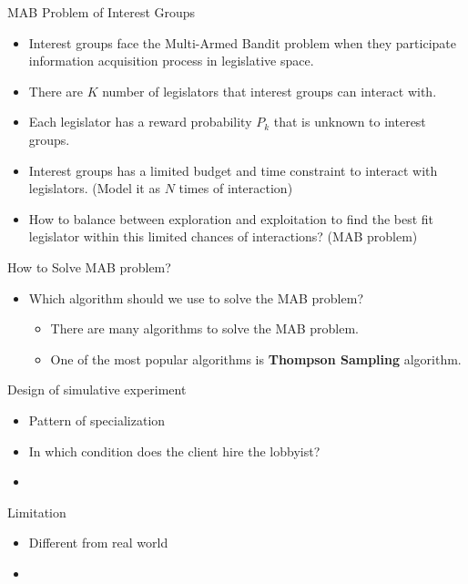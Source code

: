 \documentclass{beamer}
\begin{document}
	\begin{frame}{MAB Problem of Interest Groups}
		\begin{itemize}
			\item Interest groups face the Multi-Armed Bandit problem when they participate information acquisition process in legislative space.
			\item There are $K$ number of legislators that interest groups can interact with. 
			\item Each legislator has a reward probability $P_k$ that is unknown to interest groups.
			\item Interest groups has a limited budget and time constraint to interact with legislators. (Model it as $N$ times of interaction)
			\item How to balance between exploration and exploitation to find the best fit legislator within this limited chances of interactions? (MAB problem)
		\end{itemize}
	\end{frame}

	\begin{frame}{How to Solve MAB problem?}
		\begin{itemize}
			\item Which algorithm should we use to solve the MAB problem?
			\begin{itemize}
				\item There are many algorithms to solve the MAB problem.
				\item One of the most popular algorithms is \textbf{Thompson Sampling} algorithm.
			\end{itemize}
		\end{itemize}
	\end{frame}


	\begin{frame}{Design of simulative experiment}
		\begin{itemize}
			\item Pattern of specialization
			\item In which condition does the client hire the lobbyist?
			\item 
		\end{itemize}
	\end{frame}
	
	

	\begin{frame}{Limitation}
		\begin{itemize}
			\item Different from real world
			\item 
		\end{itemize}

	\end{frame}
\end{document}
